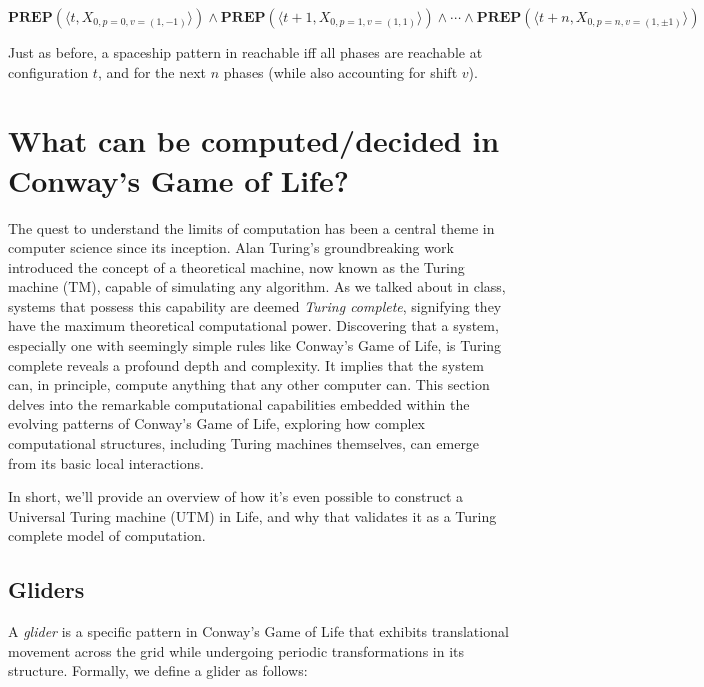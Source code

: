 \documentclass{article}
\theoremstyle{definition}
\theoremstyle{plain}
\theoremstyle{plain}
\begin{document}
\begin{equation}
  \textbf{PREP}(\langle t, X_{0,p=0,v=(1,-1)} \rangle) \land \textbf{PREP}(\langle t+1, X_{0,p=1,v=(1,1)} \rangle) \land \cdots \land \textbf{PREP}(\langle t+n, X_{0,p=n,v=(1,\pm1)} \rangle)
\end{equation}

Just as before, a spaceship pattern in reachable iff all phases are reachable at configuration $t$, and for the next $n$ phases (while also accounting for shift $v$).

\section{What can be computed/decided in Conway’s Game of Life?}

The quest to understand the limits of computation has been a central theme in computer science since its inception. Alan Turing's groundbreaking work introduced the concept of a theoretical machine, now known as the Turing machine (TM), capable of simulating any algorithm. As we talked about in class, systems that possess this capability are deemed \textit{Turing complete}, signifying they have the maximum theoretical computational power. Discovering that a system, especially one with seemingly simple rules like Conway's Game of Life, is Turing complete reveals a profound depth and complexity. It implies that the system can, in principle, compute anything that any other computer can. This section delves into the remarkable computational capabilities embedded within the evolving patterns of Conway's Game of Life, exploring how complex computational structures, including Turing machines themselves, can emerge from its basic local interactions.

In short, we'll provide an overview of how it's even possible to construct a Universal Turing machine (UTM) in Life, and why that validates it as a Turing complete model of computation.

\subsection{Gliders}

A \textit{glider} is a specific pattern in Conway's Game of Life that exhibits translational movement across the grid while undergoing periodic transformations in its structure. Formally, we define a glider as follows:
\end{document}
